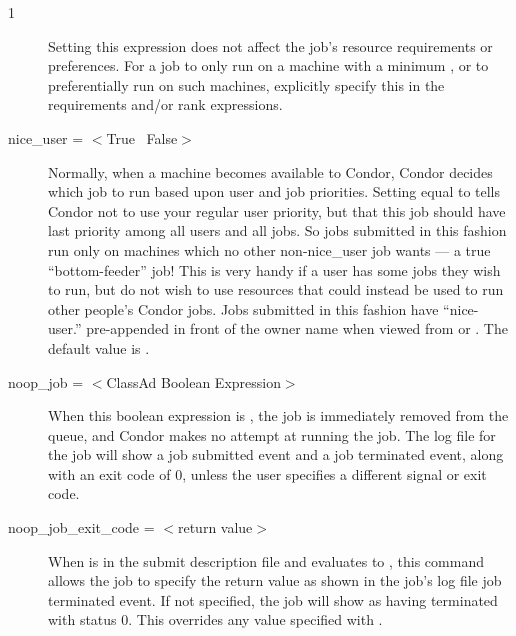 \begin{ManPage}{\label{man-condor-submit}}{1}
\begin{description}
Setting this expression does not affect the job's resource
requirements or preferences.  
For a job to only run on
a machine with a minimum \AdAttr{},
or to preferentially run on such machines, explicitly
specify this in the requirements and/or rank expressions.


\item[nice\_user = $<$True \Bar\ False$>$] \label{man-condor-submit-nice}Normally, when a machine
becomes available to Condor, Condor decides which job to run based upon
user and job priorities. Setting  equal to 
tells Condor not to use your regular user priority, but that this job
should have last priority among all users and all jobs. So jobs
submitted in this fashion run only on machines which no other
non-nice\_user job wants --- a true ``bottom-feeder'' job! This is very
handy if a user has some jobs they wish to run, but do not wish to use
resources that could instead be used to run other people's Condor jobs. Jobs
submitted in this fashion have ``nice-user.'' pre-appended in front of
the owner name when viewed from  or .  The
default value is .


\item[noop\_job = $<$ClassAd Boolean Expression$>$]
When this boolean expression is ,
the job is immediately removed from the queue,
and Condor makes no attempt at running the job.
The log file for the job will show a
job submitted event and a job terminated event,
along with an exit code of 0,
unless the user specifies a different signal or exit code.


\item[noop\_job\_exit\_code = $<$return value$>$]
When  is in the submit description file
and evaluates to ,
this command allows the job
to specify the return value as shown in the job's log file
job terminated event.
If not specified, the job will show as having terminated with status 0.
This overrides any value specified with .



\end{description}
\end{ManPage}
